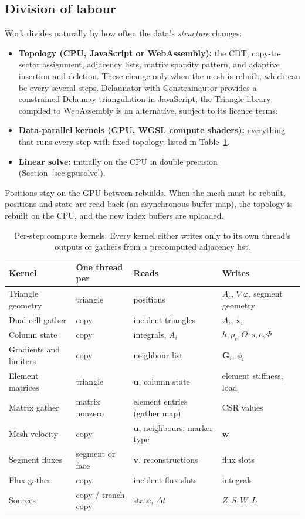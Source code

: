 \documentclass[11pt]{article}
\newcommand{\vect}[1]{\mathbf{#1}}
\begin{document}
\subsection{Division of labour}
Work divides naturally by how often the data's \emph{structure} changes:
\begin{itemize}
\item \textbf{Topology (CPU, JavaScript or WebAssembly):} the CDT, copy-to-sector assignment, adjacency lists, matrix sparsity pattern, and adaptive insertion and deletion. These change only when the mesh is rebuilt, which can be every several steps. Delaunator with Constrainautor provides a constrained Delaunay triangulation in JavaScript; the Triangle library compiled to WebAssembly is an alternative, subject to its licence terms.
\item \textbf{Data-parallel kernels (GPU, WGSL compute shaders):} everything that runs every step with fixed topology, listed in Table~\ref{tab:kernels}.
\item \textbf{Linear solve:} initially on the CPU in double precision (Section~\ref{sec:gpusolve}).
\end{itemize}
Positions stay on the GPU between rebuilds. When the mesh must be rebuilt, positions and state are read back (an asynchronous buffer map), the topology is rebuilt on the CPU, and the new index buffers are uploaded.

\begin{table}[ht]
\centering\small
\begin{tabular}{@{}llll@{}}
\toprule
Kernel & One thread per & Reads & Writes\\
\midrule
Triangle geometry & triangle & positions & $A_c$, $\nabla\varphi$, segment geometry\\
Dual-cell gather & copy & incident triangles & $A_i$, $\bar{\vect{x}}_i$\\
Column state & copy & integrals, $A_i$ & $h,\rho_c,\Theta,s,e,\Phi$\\
Gradients and limiters & copy & neighbour list & $\vect{G}_i$, $\phi_i$\\
Element matrices & triangle & $\vect{u}$, column state & element stiffness, load\\
Matrix gather & matrix nonzero & element entries (gather map) & CSR values\\
Mesh velocity & copy & $\vect{u}$, neighbours, marker type & $\vect{w}$\\
Segment fluxes & segment or face & $\vect{v}$, reconstructions & flux slots\\
Flux gather & copy & incident flux slots & integrals\\
Sources & copy / trench copy & state, $\Delta t$ & $Z,S,W,L$\\
\bottomrule
\end{tabular}
\caption{Per-step compute kernels. Every kernel either writes only to its own thread's outputs or gathers from a precomputed adjacency list.}
\label{tab:kernels}
\end{table}
\end{document}
